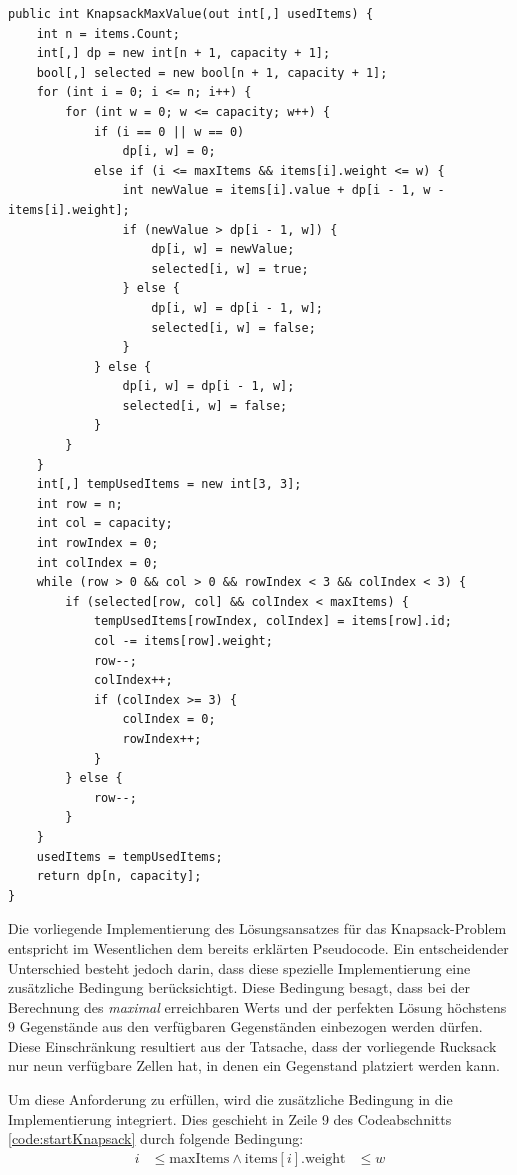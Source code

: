 \begin{lstlisting}[style=csharp, caption={Knapsack Algorithmus / Item Backtracking}, label=code:startKnapsack]
public int KnapsackMaxValue(out int[,] usedItems) {
    int n = items.Count;
    int[,] dp = new int[n + 1, capacity + 1];
    bool[,] selected = new bool[n + 1, capacity + 1];
    for (int i = 0; i <= n; i++) {
        for (int w = 0; w <= capacity; w++) {
            if (i == 0 || w == 0)
                dp[i, w] = 0;
            else if (i <= maxItems && items[i].weight <= w) {
                int newValue = items[i].value + dp[i - 1, w - items[i].weight];
                if (newValue > dp[i - 1, w]) {
                    dp[i, w] = newValue;
                    selected[i, w] = true;
                } else {
                    dp[i, w] = dp[i - 1, w];
                    selected[i, w] = false;
                }
            } else {
                dp[i, w] = dp[i - 1, w];
                selected[i, w] = false;
            }
        }
    }
    int[,] tempUsedItems = new int[3, 3];
    int row = n;
    int col = capacity;
    int rowIndex = 0;
    int colIndex = 0;
    while (row > 0 && col > 0 && rowIndex < 3 && colIndex < 3) {
        if (selected[row, col] && colIndex < maxItems) {
            tempUsedItems[rowIndex, colIndex] = items[row].id;
            col -= items[row].weight;
            row--;
            colIndex++;
            if (colIndex >= 3) {
                colIndex = 0;
                rowIndex++;
            }
        } else {
            row--;
        }
    }
    usedItems = tempUsedItems;
    return dp[n, capacity];
}
\end{lstlisting}
Die vorliegende Implementierung des Lösungsansatzes für das Knapsack-Problem entspricht im Wesentlichen dem bereits
erklärten Pseudocode. Ein entscheidender Unterschied besteht jedoch darin, dass diese spezielle Implementierung eine
zusätzliche Bedingung berücksichtigt. Diese Bedingung besagt, dass bei der Berechnung des \textit{maximal} erreichbaren
Werts und der perfekten Lösung höchstens 9 Gegenstände aus den verfügbaren Gegenständen einbezogen werden dürfen. Diese
Einschränkung resultiert aus der Tatsache, dass der vorliegende Rucksack nur neun verfügbare Zellen hat, in denen ein
Gegenstand platziert werden kann.

Um diese Anforderung zu erfüllen, wird die zusätzliche Bedingung in die Implementierung integriert. Dies geschieht in
Zeile 9 des Codeabschnitts \ref{code:startKnapsack} durch folgende Bedingung:
\\
\begin{equation}
\begin{aligned}
i &\leq \text{maxItems} \land
\text{items}[i].\text{weight} &\leq w
\end{aligned}
\end{equation}

